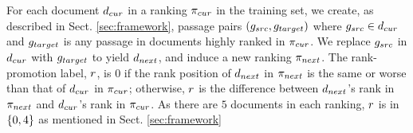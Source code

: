 

For each document $d_{cur}$ in a
ranking $\pi_{cur}$ in the training set, we create, as described in Sect. \ref{sec:framework}, passage pairs
$(g_{src},g_{target})$ where $g_{src} \in d_{cur}$ and
$g_{target}$ is any passage in documents highly ranked in $\pi_{cur}$. We replace $g_{src}$ in $d_{cur}$
with $g_{target}$ to yield $d_{next}$, and induce a new ranking
$\pi_{next}$.
The rank-promotion label, $r$, is $0$ if the rank
position of $d_{next}$ in $\pi_{next}$ is the same or worse than that of
$d_{cur}$ in $\pi_{cur}$; otherwise, $r$ is the
difference between $d_{next}$'s rank in
$\pi_{next}$ and $d_{cur}$'s rank in $\pi_{cur}$. As there are $5$
documents in each ranking,
$r$ is in $\{0,4\}$ as mentioned in
Sect. \ref{sec:framework}


